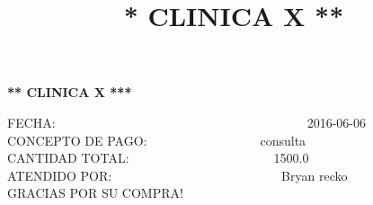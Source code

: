 \documentclass[10pt,a4paper]{letter}
\title{\bf ** CLINICA X **}
\begin{document}
\begin{center}
{\scshape\LARGE \bf *** CLINICA X ***\par}

\end{center}

FECHA:\ \ \ \ \ \ \ \ \ \ \ \ \ \ \ \ \ \ \ \ \ \ \ \ \ \ \ \ \ \ \ \ \ \ \ \ \ \ \ \ 2016-06-06 \\
CONCEPTO DE PAGO:\ \ \ \ \ \ \ \ \ \ \ \ \ \ \ \ \ \ consulta \\
CANTIDAD TOTAL:\ \ \ \ \ \ \ \ \ \ \ \ \ \ \ \ \ \ \ \ \ \ \ 1500.0 \\
ATENDIDO POR:\ \ \ \ \ \ \ \ \ \ \ \ \ \ \ \ \ \ \ \ \ \ \ \ \ \ \ Bryan recko \\
GRACIAS POR SU COMPRA! \\ \\

 
\end{document}
